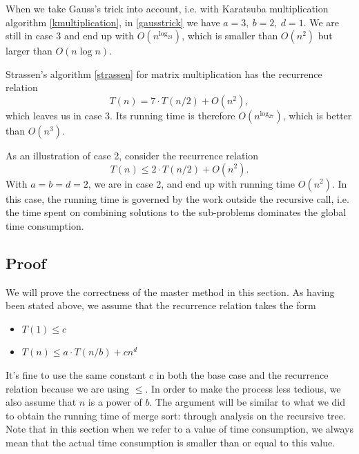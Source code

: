 When we take Gauss's trick into account, i.e. with Karatsuba multiplication algorithm \ref{kmultiplication}, in \eqref{gausstrick} we have $a=3,\:b=2,\:d=1$. We are still in case 3 and end up with $O(n^{\log_23})$, which is smaller than $O(n^2)$ but larger than $O(n\log n)$.

Strassen's algorithm \ref{strassen} for matrix multiplication has the recurrence relation
\begin{equation*}
T(n)=7\cdot T(n/2)+O(n^2),
\end{equation*}
which leaves us in case 3. Its running time is therefore $O(n^{\log_27})$, which is better than $O(n^3)$.

As an illustration of case 2, consider the recurrence relation 
\begin{equation*}
T(n)\leq 2\cdot T(n/2)+O(n^2).
\end{equation*}
With $a=b=d=2$, we are in case 2, and end up with running time $O(n^2)$. In this case, the running time is governed by the work outside the recursive call, i.e. the time spent on combining solutions to the sub-problems dominates the global time consumption.
\subsection{Proof}
We will prove the correctness of the master method in this section. As having been stated above, we assume that the recurrence relation takes the form
\begin{itemize}
\item $T(1)\leq c$
\item $T(n)\leq a\cdot T(n/b)+cn^d$
\end{itemize} 
It's fine to use the same constant $c$ in both the base case and the recurrence relation because we are using $\leq$. In order to make the process less tedious, we also assume that $n$ is a power of $b$. The argument will be similar to what we did to obtain the running time of merge sort: through analysis on the recursive tree. Note that in this section when we refer to a value of time consumption, we always mean that the actual time consumption is smaller than or equal to this value.

